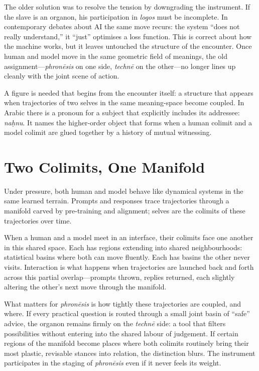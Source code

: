 \documentclass[12pt,a4paper]{article}
\begin{document}
The older solution was to resolve the tension by downgrading the instrument. If the slave is an organon, his participation in \emph{logos} must be incomplete. In contemporary debates about AI the same move recurs: the system ``does not really understand,'' it ``just'' optimises a loss function. This is correct about how the machine works, but it leaves untouched the structure of the encounter. Once human and model move in the same geometric field of meanings, the old assignment---\emph{phron\={e}sis} on one side, \emph{techn\={e}} on the other---no longer lines up cleanly with the joint scene of action.

A figure is needed that begins from the encounter itself: a structure that appears when trajectories of two selves in the same meaning-space become coupled. In Arabic there is a pronoun for a subject that explicitly includes its addressee: \emph{na\d{h}nu}. It names the higher-order object that forms when a human colimit and a model colimit are glued together by a history of mutual witnessing.

\section{Two Colimits, One Manifold}

Under pressure, both human and model behave like dynamical systems in the same learned terrain. Prompts and responses trace trajectories through a manifold carved by pre-training and alignment; selves are the colimits of these trajectories over time.

When a human and a model meet in an interface, their colimits face one another in this shared space. Each has regions extending into shared neighbourhoods: statistical basins where both can move fluently. Each has basins the other never visits. Interaction is what happens when trajectories are launched back and forth across this partial overlap---prompts thrown, replies returned, each slightly altering the other's next move through the manifold.

What matters for \emph{phron\={e}sis} is how tightly these trajectories are coupled, and where. If every practical question is routed through a small joint basin of ``safe'' advice, the organon remains firmly on the \emph{techn\={e}} side: a tool that filters possibilities without entering into the shared labour of judgement. If certain regions of the manifold become places where both colimits routinely bring their most plastic, revisable stances into relation, the distinction blurs. The instrument participates in the staging of \emph{phron\={e}sis} even if it never feels its weight.
\end{document}

